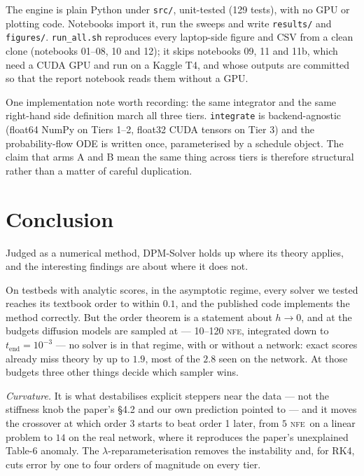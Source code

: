 \documentclass[11pt,a4paper]{article}
\newcommand{\NFE}{\textsc{nfe}}
\newcommand{\lam}{\lambda}
\begin{document}
The engine is plain Python under \texttt{src/}, unit-tested (129 tests), with no
GPU or plotting code. Notebooks import it, run the sweeps and write
\texttt{results/} and \texttt{figures/}. \texttt{run\_all.sh} reproduces every
laptop-side figure and CSV from a clean clone (notebooks 01--08, 10 and 12); it
skips notebooks 09, 11 and 11b, which need a CUDA GPU and run on a Kaggle T4, and
whose outputs are committed so that the report notebook reads them without a GPU.

One implementation note worth recording: the same integrator and the same
right-hand side definition march all three tiers. \texttt{integrate} is
backend-agnostic (float64 NumPy on Tiers 1--2, float32 CUDA tensors on Tier 3)
and the probability-flow ODE is written once, parameterised by a schedule object.
The claim that arms A and B mean the same thing across tiers is therefore
structural rather than a matter of careful duplication.

\section{Conclusion}

Judged as a numerical method, DPM-Solver holds up where its theory applies, and
the interesting findings are about where it does not.

On testbeds with analytic scores, in the asymptotic regime, every solver we tested
reaches its textbook order to within $0.1$, and the published code implements the
method correctly. But the order theorem is a statement about $h\to0$, and at the
budgets diffusion models are sampled at --- 10--120 \NFE, integrated down to
$t_{\text{end}}=10^{-3}$ --- no solver is in that regime, with or without a
network: exact scores already miss theory by up to $1.9$, most of the $2.8$ seen on
the network. At those budgets three other things decide which sampler wins.

\emph{Curvature.} It is what destabilises explicit steppers near the data --- not
the stiffness knob the paper's \S4.2 and our own prediction pointed to --- and it
moves the crossover at which order 3 starts to beat order 1 later, from $5$ \NFE\
on a linear problem to $14$ on the real network, where it reproduces the paper's
unexplained Table-6 anomaly. The $\lam$-reparameterisation removes the instability
and, for RK4, cuts error by one to four orders of magnitude on every tier.
\end{document}
